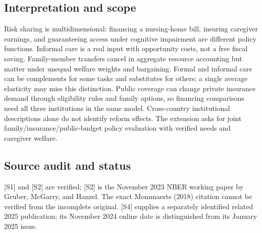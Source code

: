 \documentclass[11pt,a4paper]{article}
\begin{document}
\subsection*{Interpretation and scope}
Risk sharing is multidimensional: financing a nursing-home bill, insuring caregiver earnings, and guaranteeing access under cognitive impairment are different policy functions. Informal care is a real input with opportunity costs, not a free fiscal saving. Family-member transfers cancel in aggregate resource accounting but matter under unequal welfare weights and bargaining. Formal and informal care can be complements for some tasks and substitutes for others; a single average elasticity may miss this distinction. Public coverage can change private insurance demand through eligibility rules and family options, so financing comparisons need all three institutions in the same model. Cross-country institutional descriptions alone do not identify reform effects. The extension asks for joint family/insurance/public-budget policy evaluation with verified needs and caregiver welfare.

\subsection*{Source audit and status}
[S1] and [S2] are verified; [S2] is the November 2023 NBER working paper by Gruber, McGarry, and Hanzel. The exact Mommaerts (2018) citation cannot be verified from the incomplete original. [S4] supplies a separately identified related 2025 publication; its November 2024 online date is distinguished from its January 2025 issue.
\end{document}

